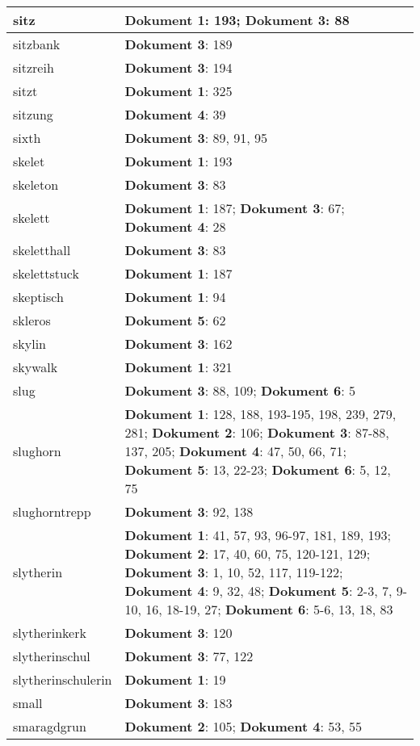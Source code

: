 \documentclass[a5paper]{article}
\begin{document}
\begin{longtable}[l]{|l|p{3in}|}
\hline
sitz & \textbf{Dokument 1}: 193; \textbf{Dokument 3}: 88 \\
\hline
sitzbank & \textbf{Dokument 3}: 189 \\
\hline
sitzreih & \textbf{Dokument 3}: 194 \\
\hline
sitzt & \textbf{Dokument 1}: 325 \\
\hline
sitzung & \textbf{Dokument 4}: 39 \\
\hline
sixth & \textbf{Dokument 3}: 89, 91, 95 \\
\hline
skelet & \textbf{Dokument 1}: 193 \\
\hline
skeleton & \textbf{Dokument 3}: 83 \\
\hline
skelett & \textbf{Dokument 1}: 187; \textbf{Dokument 3}: 67; \textbf{Dokument 4}: 28 \\
\hline
skeletthall & \textbf{Dokument 3}: 83 \\
\hline
skelettstuck & \textbf{Dokument 1}: 187 \\
\hline
skeptisch & \textbf{Dokument 1}: 94 \\
\hline
skleros & \textbf{Dokument 5}: 62 \\
\hline
skylin & \textbf{Dokument 3}: 162 \\
\hline
skywalk & \textbf{Dokument 1}: 321 \\
\hline
slug & \textbf{Dokument 3}: 88, 109; \textbf{Dokument 6}: 5 \\
\hline
slughorn & \textbf{Dokument 1}: 128, 188, 193-195, 198, 239, 279, 281; \textbf{Dokument 2}: 106; \textbf{Dokument 3}: 87-88, 137, 205; \textbf{Dokument 4}: 47, 50, 66, 71; \textbf{Dokument 5}: 13, 22-23; \textbf{Dokument 6}: 5, 12, 75 \\
\hline
slughorntrepp & \textbf{Dokument 3}: 92, 138 \\
\hline
slytherin & \textbf{Dokument 1}: 41, 57, 93, 96-97, 181, 189, 193; \textbf{Dokument 2}: 17, 40, 60, 75, 120-121, 129; \textbf{Dokument 3}: 1, 10, 52, 117, 119-122; \textbf{Dokument 4}: 9, 32, 48; \textbf{Dokument 5}: 2-3, 7, 9-10, 16, 18-19, 27; \textbf{Dokument 6}: 5-6, 13, 18, 83 \\
\hline
slytherinkerk & \textbf{Dokument 3}: 120 \\
\hline
slytherinschul & \textbf{Dokument 3}: 77, 122 \\
\hline
slytherinschulerin & \textbf{Dokument 1}: 19 \\
\hline
small & \textbf{Dokument 3}: 183 \\
\hline
smaragdgrun & \textbf{Dokument 2}: 105; \textbf{Dokument 4}: 53, 55 \\

\end{longtable}
\end{document}
